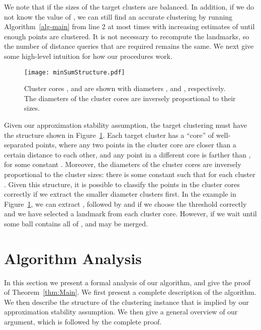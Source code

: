 \documentclass{llncs} \usepackage{algorithm}
\begin{document}
We note that  if the sizes of the target clusters are balanced.  In addition, if we do not know the value of , we can still find an accurate clustering by running Algorithm~\ref{alg-main} from line 2 at most  times with increasing estimates of  until enough points are clustered.  It is not necessary to recompute the landmarks, so the number of distance queries that are required remains the same.  We next give some high-level intuition for how our procedures work.

\begin{figure}
\begin{center}
\texttt{[image: minSumStructure.pdf]}
\caption{Cluster cores ,  and  are shown with diameters ,  and , respectively.  The diameters of the cluster cores are inversely proportional to their sizes.  \label{fig:minSumStructure}}
\end{center}
\end{figure}

Given our approximation stability assumption, the target clustering must have the structure shown in Figure~\ref{fig:minSumStructure}.  Each target cluster  has a ``core'' of well-separated points, where any two points in the cluster core are closer than a certain distance  to each other, and any point in a different core is farther than , for some constant .  Moreover, the diameters of the cluster cores are inversely proportional to the cluster sizes: there is some constant  such that  for each cluster .  Given this structure, it is possible to classify the points in the cluster cores correctly if we extract the smaller diameter clusters first.  In the example in Figure~\ref{fig:minSumStructure}, we can extract , followed by  and  if we choose the threshold  correctly and we have selected a landmark from each cluster core.  However, if we wait until some ball contains all of ,  and  may be merged.

\section{Algorithm Analysis}

In this section we present a formal analysis of our algorithm, and give the proof of Theorem~\ref{thm:Main}.  We first present a complete description of the algorithm.  We then describe the structure of the clustering instance that is implied by our approximation stability assumption.  We then give a general overview of our argument, which is followed by the complete proof.
\end{document}
